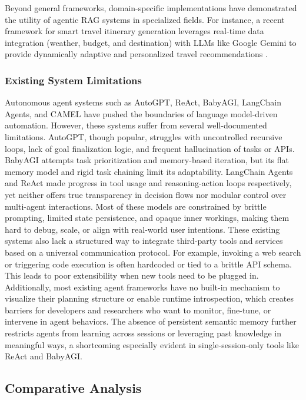 \documentclass[lettersize,journal]{IEEEtran}
\begin{document}
Beyond general frameworks, domain-specific implementations have demonstrated the utility of agentic RAG systems in specialized fields. For instance, a recent framework for smart travel itinerary generation leverages real-time data integration (weather, budget, and destination) with LLMs like Google Gemini to provide dynamically adaptive and personalized travel recommendations \cite{remya2026rag}.

\subsubsection{Existing System Limitations}
Autonomous agent systems such as AutoGPT, ReAct, BabyAGI, LangChain Agents, and CAMEL have pushed the boundaries of language model-driven automation. However, these systems suffer from several well-documented limitations. AutoGPT, though popular, struggles with uncontrolled recursive loops, lack of goal finalization logic, and frequent hallucination of tasks or APIs. BabyAGI attempts task prioritization and memory-based iteration, but its flat memory model and rigid task chaining limit its adaptability. LangChain Agents and ReAct made progress in tool usage and reasoning-action loops respectively, yet neither offers true transparency in decision flows nor modular control over multi-agent interactions. Most of these models are constrained by brittle prompting, limited state persistence, and opaque inner workings, making them hard to debug, scale, or align with real-world user intentions. These existing systems also lack a structured way to integrate third-party tools and services based on a universal communication protocol. For example, invoking a web search or triggering code execution is often hardcoded or tied to a brittle API schema. This leads to poor extensibility when new tools need to be plugged in. Additionally, most existing agent frameworks have no built-in mechanism to visualize their planning structure or enable runtime introspection, which creates barriers for developers and researchers who want to monitor, fine-tune, or intervene in agent behaviors. The absence of persistent semantic memory further restricts agents from learning across sessions or leveraging past knowledge in meaningful ways, a shortcoming especially evident in single-session-only tools like ReAct and BabyAGI.

\subsection{Comparative Analysis}
\end{document}
